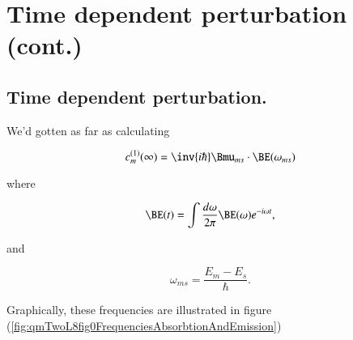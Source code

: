 %
%

%
%

\chapter{Time dependent perturbation (cont.)}
\label{chap:qmTwoL8}
{}
\date{Oct 3, 2011}

\beginArtWithToc

%

\section{Time dependent perturbation.}

We'd gotten as far as calculating

\begin{equation}\label{eqn:qmTwoL8:10}
c_m^{(1)}(\infty) = \inv{i \hbar} \Bmu_{ms} \cdot \BE(\omega_{ms})
\end{equation}

where

\begin{equation}\label{eqn:qmTwoL8:30}
\BE(t) = \int \frac{d\omega}{2 \pi} \BE(\omega) e^{-i \omega t},
\end{equation}

and

\begin{equation}\label{eqn:qmTwoL8:50}
\omega_{ms} = \frac{E_m - E_s}{\hbar}.
\end{equation}

Graphically, these frequencies are illustrated in figure (\ref{fig:qmTwoL8fig0FrequenciesAbsorbtionAndEmission})

